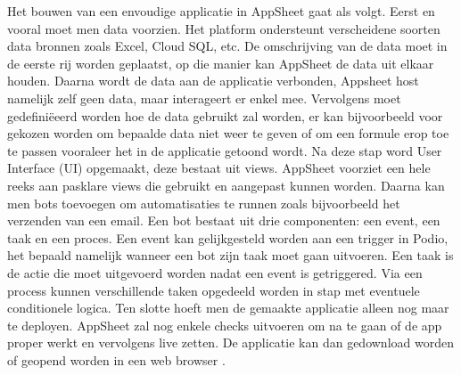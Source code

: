 
Het bouwen van een envoudige applicatie in AppSheet gaat als volgt. Eerst en vooral moet men data voorzien. Het platform ondersteunt verscheidene soorten data bronnen zoals Excel, Cloud SQL, etc. De omschrijving van de data moet in de eerste rij worden geplaatst, op die manier kan AppSheet de data uit elkaar houden. Daarna wordt de data aan de applicatie verbonden, Appsheet host namelijk zelf geen data, maar interageert er enkel mee. Vervolgens moet gedefiniëeerd worden hoe de data gebruikt zal worden, er kan bijvoorbeeld voor gekozen worden om bepaalde data niet weer te geven of om een formule erop toe te passen vooraleer het in de applicatie getoond wordt. Na deze stap word User Interface (UI) opgemaakt, deze bestaat uit views. AppSheet voorziet een hele reeks aan pasklare views die gebruikt en aangepast kunnen worden.  Daarna kan men bots toevoegen om automatisaties te runnen zoals bijvoorbeeld het verzenden van een email. Een bot bestaat uit drie componenten: een event, een taak en een proces. Een event kan gelijkgesteld worden aan een trigger in Podio, het bepaald namelijk wanneer een bot zijn taak moet gaan uitvoeren. Een taak is de actie die moet uitgevoerd worden nadat een event is getriggered. Via een process kunnen verschillende taken opgedeeld worden in stap met eventuele conditionele logica. Ten slotte hoeft men de gemaakte applicatie alleen nog maar te deployen. AppSheet zal nog enkele checks uitvoeren om na te gaan of de app proper werkt en vervolgens live zetten. De applicatie kan dan gedownload worden of geopend worden in een web browser \autocite{AppSheetHowToCreate}. \\
